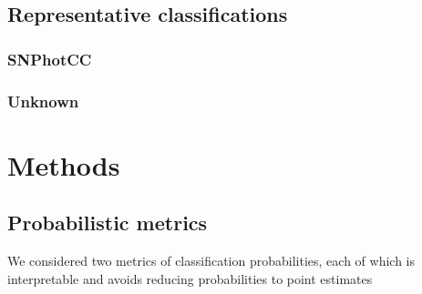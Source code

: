 \documentclass[\docopts]{\docclass}
\begin{document}
\subsubsection{}
\label{sec:almost}

\subsubsection{}
\label{sec:noisy}

\subsubsection{}
\label{sec:tunnel}

\subsubsection{}
\label{sec:cruise}

\subsubsection{}
\label{sec:subsume}

\subsection{Representative classifications}
\label{sec:realdata}

\subsubsection{SNPhotCC}
\label{sec:snphotcc}

\subsubsection{Unknown}
\label{sec:mystery}

\section{Methods}
\label{sec:methods}

\subsection{Probabilistic metrics}
\label{sec:metrics}

We considered two metrics of classification probabilities, each of which is interpretable and avoids reducing probabilities to point estimates
\end{document}

